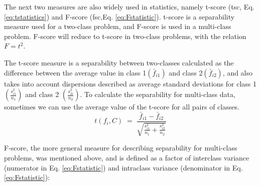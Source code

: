 \documentclass[a4paper,fleqn]{report}
\newcommand\be{\vspace*{1pt}\begin{equation}}
\newcommand\ee{\end{equation}\vspace*{1pt}}
\begin{document}
The next two measures are also widely used in statistics, namely t-score (tsc, Eq.\ref{eq:tstatistics}) and F-score 
(fsc,Eq. \ref{eq:Fstatistic}). 
t-score is a separability measure used for a two-class problem, and 
F-score is used in a multi-class problem. F-score will reduce to t-score in two-class problems, with the relation $F=t^2$.

The t-score measure is a separability between two-classes calculated as the difference between the average value in 
class 1$\left( \bar{f}_{i1} \right)$ and class 2$ \left( \bar{f}_{i2} \right)$, and also takes into account 
 dispersions described as average standard deviations for class 1 $ \left( \frac{s^{2}_{i1}}{n_1} \right)$ 
and class 2 $\left( \frac{s^{2}_{2i}}{n_2} \right)$. 
To calculate the separability for multi-class data, sometimes we can use the average value of the t-score for all pairs of classes.
\be \label{eq:tstatistics}
t(f_i,C)\; =\; \frac{\bar{f}_{i1}-\bar{f}_{i2}}{\sqrt{\frac{s^{2}_{i1}}{n_1}+\frac{s^{2}_{i2}}{n_2}}}
\ee

F-score, the more general measure for describing separability for multi-class problems, was mentioned above, 
and is defined as a factor of interclass variance 
(numerator in Eq. \ref{eq:Fstatistic}) and intraclass variance (denominator in Eq. \ref{eq:Fstatistic}):
\end{document}
